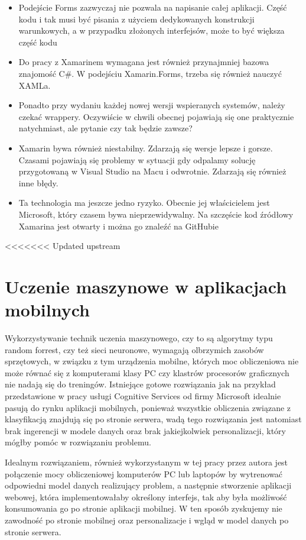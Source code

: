 \documentclass[brudnopis]{xmgr}
\begin{document}
\begin{itemize}
\item
Podejście Forms zazwyczaj nie pozwala na napisanie całej aplikacji. Część kodu i tak musi być pisania z użyciem dedykowanych konstrukcji warunkowych, a w przypadku złożonych interfejsów, może to być większa część kodu
\item
Do pracy z Xamarinem wymagana jest również przynajmniej bazowa znajomość C\#. W podejściu Xamarin.Forms, trzeba się również nauczyć XAMLa.
\item
Ponadto przy wydaniu każdej nowej wersji wspieranych systemów, należy czekać wrappery. Oczywiście w chwili obecnej pojawiają się one praktycznie natychmiast, ale pytanie czy tak będzie zawsze?
\item
Xamarin bywa również niestabilny. Zdarzają się wersje lepsze i gorsze. Czasami pojawiają się problemy w sytuacji gdy odpalamy solucję przygotowaną w Visual Studio na Macu i odwrotnie. Zdarzają się również inne błędy.
\item
Ta technologia ma jeszcze jedno ryzyko. Obecnie jej właścicielem jest Microsoft, który czasem bywa nieprzewidywalny. Na szczęście kod źródłowy Xamarina jest otwarty i można go znaleźć na GitHubie

\end{itemize}

<<<<<<< Updated upstream
\section{Uczenie maszynowe w aplikacjach mobilnych}

Wykorzystywanie technik uczenia maszynowego, czy to są algorytmy typu random forrest, czy też sieci neuronowe, wymagają olbrzymich zasobów sprzętowych, w związku z tym urządzenia mobilne, których moc obliczeniowa nie może równać się z komputerami klasy PC czy klastrów procesorów graficznych nie nadają się do treningów. Istniejące gotowe rozwiązania jak na przykład przedstawione w pracy usługi Cognitive Services od firmy Microsoft idealnie pasują do rynku aplikacji mobilnych, ponieważ wszystkie obliczenia związane z klasyfikacją znajdują się po stronie serwera, wadą tego rozwiązania jest natomiast brak ingerencji w modele danych oraz brak jakiejkolwiek personalizacji, który mógłby pomóc w rozwiązaniu problemu.

Idealnym rozwiązaniem, również wykorzystanym w tej pracy przez autora jest połączenie mocy obliczeniowej komputerów PC lub laptopów by wytrenować odpowiedni model danych realizujący problem, a następnie stworzenie aplikacji webowej, która implementowałaby określony interfejs, tak aby była możliwość konsumowania go po stronie aplikacji mobilnej. W ten sposób zyskujemy nie zawodność po stronie mobilnej oraz personalizacje i wgląd w model danych po stronie serwera.
\end{document}
